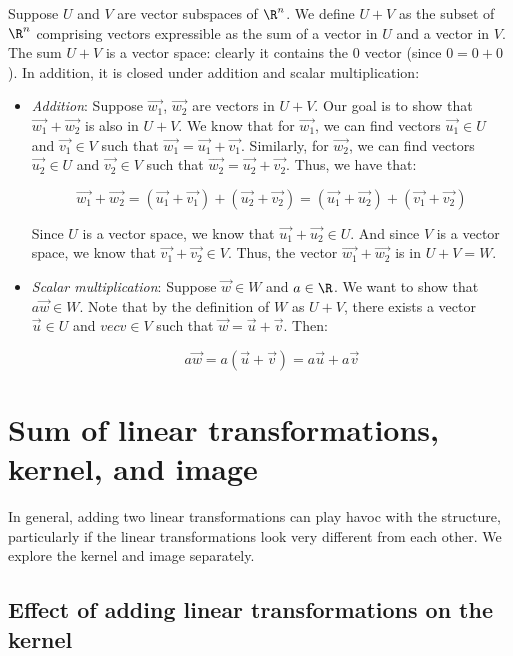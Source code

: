 \documentclass[10pt]{amsart}
\begin{document}
Suppose $U$ and $V$ are vector subspaces of $\R^n$. We define $U + V$ as the
subset of $\R^n$ comprising vectors expressible as the sum of a vector
in $U$ and a vector in $V$. The sum $U + V$ is a vector space: clearly
it contains the $0$ vector (since $0 = 0 + 0$). In addition, it is
closed under addition and scalar multiplication:

\begin{itemize}
\item {\em Addition}: Suppose $\vec{w_1}$, $\vec{w_2}$ are vectors in
  $U + V$. Our goal is to show that $\vec{w_1} + \vec{w_2}$ is also in
  $U + V$. We know that for $\vec{w_1}$, we can find vectors
  $\vec{u_1} \in U$ and $\vec{v_1} \in V$ such that $\vec{w_1} =
  \vec{u_1} + \vec{v_1}$. Similarly, for $\vec{w_2}$, we can find
  vectors $\vec{u_2} \in U$ and $\vec{v_2} \in V$ such that $\vec{w_2}
  = \vec{u_2} + \vec{v_2}$. Thus, we have that:

  $$\vec{w_1} + \vec{w_2} = (\vec{u_1} + \vec{v_1}) + (\vec{u_2} + \vec{v_2}) = (\vec{u_1} + \vec{u_2}) + (\vec{v_1} + \vec{v_2})$$

  Since $U$ is a vector space, we know that $\vec{u_1} + \vec{u_2} \in
  U$. And since $V$ is a vector space, we know that $\vec{v_1} +
  \vec{v_2} \in V$. Thus, the vector $\vec{w_1} + \vec{w_2}$ is in $U
  + V = W$.  

\item {\em Scalar multiplication}: Suppose $\vec{w} \in W$ and $a \in
  \R$. We want to show that $a\vec{w} \in W$. Note that by the
  definition of $W$ as $U + V$, there exists a vector $\vec{u} \in U$
  and $vec{v} \in V$ such that $\vec{w} = \vec{u} + \vec{v}$. Then:

  $$a\vec{w} = a(\vec{u} + \vec{v}) = a\vec{u} + a\vec{v}$$
\end{itemize}


\section{Sum of linear transformations, kernel, and image}

In general, adding two linear transformations can play havoc with the
structure, particularly if the linear transformations look very
different from each other. We explore the kernel and image separately.


\subsection{Effect of adding linear transformations on the kernel}
\end{document}
